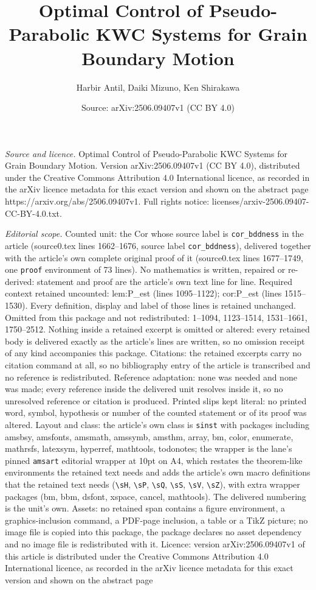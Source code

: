 \documentclass[10pt,a4paper]{amsart}
\title[Optimal Control of Pseudo-Parabolic KWC Systems for Grain Bo]{Optimal Control of Pseudo-Parabolic KWC Systems for Grain Boundary Motion}
\author{Harbir Antil, Daiki Mizuno, Ken Shirakawa}
\date{Source: arXiv:2506.09407v1 (CC BY 4.0)}
\begin{document}
\maketitle

\noindent\emph{Source and licence.} Optimal Control of Pseudo-Parabolic KWC Systems for Grain Boundary Motion. Version arXiv:2506.09407v1 (CC BY 4.0), distributed under the Creative Commons Attribution 4.0 International licence, as recorded in the arXiv licence metadata for this exact version and shown on the abstract page https://arxiv.org/abs/2506.09407v1. Full rights notice: licenses/arxiv-2506.09407-CC-BY-4.0.txt.\par\smallskip

\noindent\textit{Editorial scope.} Counted unit: the Cor whose source label is \texttt{cor\_bddness} in the article (source0.tex lines 1662--1676, source label \texttt{cor\_bddness}), delivered together with the article's own complete original proof of it (source0.tex lines 1677--1749, one \texttt{proof} environment of 73 lines). No mathematics is written, repaired or re-derived: statement and proof are the article's own text line for line. Required context retained uncounted: lem:P\_est (lines 1095--1122); cor:P\_est (lines 1515--1530). Every definition, display and label of those lines is retained unchanged. Omitted from this package and not redistributed: 1--1094, 1123--1514, 1531--1661, 1750--2512. Nothing inside a retained excerpt is omitted or altered: every retained body is delivered exactly as the article's lines are written, so no omission receipt of any kind accompanies this package. Citations: the retained excerpts carry no citation command at all, so no bibliography entry of the article is transcribed and no reference is redistributed. Reference adaptation: none was needed and none was made; every reference inside the delivered unit resolves inside it, so no unresolved reference or citation is produced. Printed slips kept literal: no printed word, symbol, hypothesis or number of the counted statement or of its proof was altered. Layout and class: the article's own class is \texttt{sinst} with packages including amsbsy, amsfonts, amsmath, amssymb, amsthm, array, bm, color, enumerate, mathrsfs, latexsym, hyperref, mathtools, todonotes; the wrapper is the lane's pinned \texttt{amsart} editorial wrapper at 10pt on A4, which restates the theorem-like environments the retained text needs and adds the article's own macro definitions that the retained text needs (\texttt{\textbackslash sH}, \texttt{\textbackslash sP}, \texttt{\textbackslash sQ}, \texttt{\textbackslash sS}, \texttt{\textbackslash sV}, \texttt{\textbackslash sZ}), with extra wrapper packages (bm, bbm, dsfont, xspace, cancel, mathtools). The delivered numbering is the unit's own. Assets: no retained span contains a figure environment, a graphics-inclusion command, a PDF-page inclusion, a table or a TikZ picture; no image file is copied into this package, the package declares no asset dependency and no image file is redistributed with it. Licence: version arXiv:2506.09407v1 of this article is distributed under the Creative Commons Attribution 4.0 International licence, as recorded in the arXiv licence metadata for this exact version and shown on the abstract page 
\end{document}
